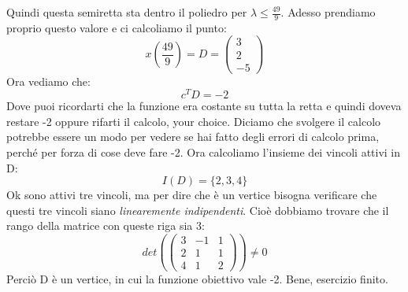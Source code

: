 Quindi questa semiretta sta dentro il poliedro per $\lambda \leq \frac{49}{9}$. Adesso prendiamo proprio questo valore e ci calcoliamo il punto:
\begin{equation*}
    x(\frac{49}{9}) = D = \begin{pmatrix}
        3\\
        2\\
        -5
    \end{pmatrix}
\end{equation*}
Ora vediamo che:
\begin{equation*}
    c^TD = -2
\end{equation*}
Dove puoi ricordarti che la funzione era costante su tutta la retta e quindi doveva restare -2 oppure rifarti il calcolo, your choice. Diciamo che svolgere il calcolo potrebbe essere un modo per vedere se hai fatto degli errori di calcolo prima, perché per forza di cose deve fare -2. Ora calcoliamo l'insieme dei vincoli attivi in D:
\begin{equation*}
    I(D) = \{2,3,4\}
\end{equation*}
Ok sono attivi tre vincoli, ma per dire che è un vertice bisogna verificare che questi tre vincoli siano \textit{linearemente indipendenti}. Cioè dobbiamo trovare che il rango della matrice con queste riga sia 3:
\begin{equation*}
    det\left(\begin{pmatrix}
        3 & -1 & 1\\
        2 & 1 &  1\\
        4 & 1 & 2
    \end{pmatrix}\right) \neq 0 
\end{equation*}
Perciò D è un vertice, in cui la funzione obiettivo vale -2. Bene, esercizio finito.


